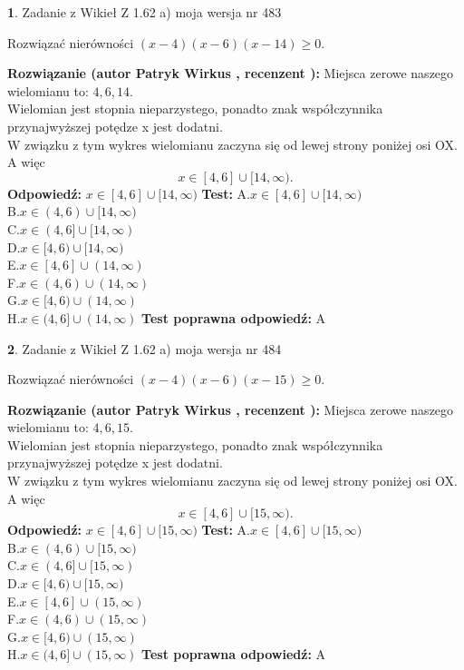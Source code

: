 \documentclass[12pt, a4paper]{article}
\theoremstyle{definition} %
\newtheorem{zad}{}
\newcommand{\zadStart}[1]{\begin{zad}#1\newline}
\newcommand{\zadStop}{\end{zad}}
\newcommand{\rozwStart}[2]{\noindent \textbf{Rozwiązanie (autor #1 , recenzent #2): }\newline}
\newcommand{\rozwStop}{\newline}
\newcommand{\odpStart}{\noindent \textbf{Odpowiedź:}\newline}
\newcommand{\odpStop}{\newline}
\newcommand{\testStart}{\noindent \textbf{Test:}\newline}
\newcommand{\testStop}{\newline}
\newcommand{\kluczStart}{\noindent \textbf{Test poprawna odpowiedź:}\newline}
\newcommand{\kluczStop}{\newline}
\begin{document}
\zadStart{Zadanie z Wikieł Z 1.62 a) moja wersja nr 483}

Rozwiązać nierówności $(x-4)(x-6)(x-14)\ge0$.
\zadStop
\rozwStart{Patryk Wirkus}{}
Miejsca zerowe naszego wielomianu to: $4, 6, 14$.\\
Wielomian jest stopnia nieparzystego, ponadto znak współczynnika przy\linebreak najwyższej potędze x jest dodatni.\\ W związku z tym wykres wielomianu zaczyna się od lewej strony poniżej osi OX. A więc $$x \in [4,6] \cup [14,\infty).$$
\rozwStop
\odpStart
$x \in [4,6] \cup [14,\infty)$
\odpStop
\testStart
A.$x \in [4,6] \cup [14,\infty)$\\
B.$x \in (4,6) \cup [14,\infty)$\\
C.$x \in (4,6] \cup [14,\infty)$\\
D.$x \in [4,6) \cup [14,\infty)$\\
E.$x \in [4,6] \cup (14,\infty)$\\
F.$x \in (4,6) \cup (14,\infty)$\\
G.$x \in [4,6) \cup (14,\infty)$\\
H.$x \in (4,6] \cup (14,\infty)$
\testStop
\kluczStart
A
\kluczStop



\zadStart{Zadanie z Wikieł Z 1.62 a) moja wersja nr 484}

Rozwiązać nierówności $(x-4)(x-6)(x-15)\ge0$.
\zadStop
\rozwStart{Patryk Wirkus}{}
Miejsca zerowe naszego wielomianu to: $4, 6, 15$.\\
Wielomian jest stopnia nieparzystego, ponadto znak współczynnika przy\linebreak najwyższej potędze x jest dodatni.\\ W związku z tym wykres wielomianu zaczyna się od lewej strony poniżej osi OX. A więc $$x \in [4,6] \cup [15,\infty).$$
\rozwStop
\odpStart
$x \in [4,6] \cup [15,\infty)$
\odpStop
\testStart
A.$x \in [4,6] \cup [15,\infty)$\\
B.$x \in (4,6) \cup [15,\infty)$\\
C.$x \in (4,6] \cup [15,\infty)$\\
D.$x \in [4,6) \cup [15,\infty)$\\
E.$x \in [4,6] \cup (15,\infty)$\\
F.$x \in (4,6) \cup (15,\infty)$\\
G.$x \in [4,6) \cup (15,\infty)$\\
H.$x \in (4,6] \cup (15,\infty)$
\testStop
\kluczStart
A
\kluczStop
\end{document}
